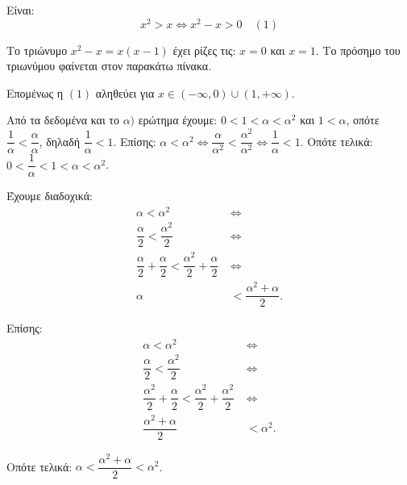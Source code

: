 
\begin{alist}
\item Είναι:
\[x^2 > x \Leftrightarrow x^2 - x > 0 \quad (1)\]

Το τριώνυμο $x^2 - x = x(x - 1)$ έχει ρίζες τις: $x = 0$ και $x = 1$.
Το πρόσημο του τριωνύμου φαίνεται στον παρακάτω πίνακα.

\begin{center}
\end{center}

Επομένως η $(1)$ αληθεύει για $x \in (-\infty, 0) \cup (1, +\infty)$.

\item 
\begin{rlist}
\item Από τα δεδομένα και το $\alpha)$ ερώτημα έχουμε: $0 < 1 < \alpha < \alpha^2$ και
$1 < \alpha$, οπότε $\dfrac{1}{\alpha} < \dfrac{\alpha}{\alpha}$, δηλαδή
$\dfrac{1}{\alpha} < 1$.
Επίσης: $\alpha < \alpha^2 \Leftrightarrow \dfrac{\alpha}{\alpha^2} < \dfrac{\alpha^2}{\alpha^2} \Leftrightarrow \dfrac{1}{\alpha} < 1$.
Οπότε τελικά: $0 < \dfrac{1}{\alpha} < 1 < \alpha < \alpha^2$.

\item Έχουμε διαδοχικά:
\begin{align*}
\alpha < \alpha^2 \ &\Leftrightarrow \\
\dfrac{\alpha}{2} < \dfrac{\alpha^2}{2} \ &\Leftrightarrow \\
\dfrac{\alpha}{2} + \dfrac{\alpha}{2} < \dfrac{\alpha^2}{2} + \dfrac{\alpha}{2} \ &\Leftrightarrow \\
\alpha &< \dfrac{\alpha^2 + \alpha}{2}.
\end{align*}

Επίσης:
\begin{align*}
\alpha < \alpha^2 \ &\Leftrightarrow \\
\dfrac{\alpha}{2} < \dfrac{\alpha^2}{2} \ &\Leftrightarrow \\
\dfrac{\alpha^2}{2} + \dfrac{\alpha}{2} < \dfrac{\alpha^2}{2} + \dfrac{\alpha^2}{2} \ &\Leftrightarrow \\
\dfrac{\alpha^2 + \alpha}{2} &< \alpha^2.
\end{align*}

Οπότε τελικά: $\alpha < \dfrac{\alpha^2 + \alpha}{2} < \alpha^2$.
\end{rlist}
\end{alist}

